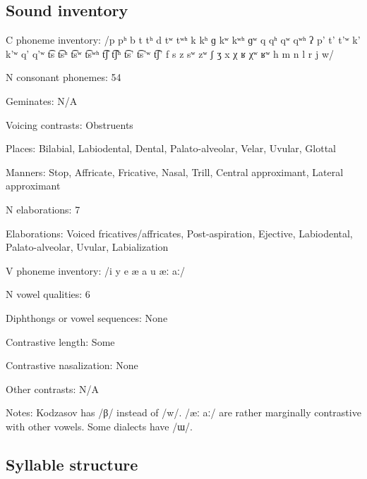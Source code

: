 {\subsection*{Sound inventory}
\begin{appendixdesc}

\item[C phoneme inventory:] /p pʰ b t tʰ d tʷ tʷʰ k kʰ ɡ kʷ kʷʰ ɡʷ q qʰ qʷ qʷʰ ʔ p’ t’ t’ʷ k’ k’ʷ q’ q’ʷ t͡s t͡sʰ t͡sʷ t͡sʷʰ t͡ʃ t͡ʃʰ t͡s’ t͡s’ʷ t͡ʃ’ f s z sʷ zʷ ʃ ʒ x χ ʁ χʷ ʁʷ h m n l r j w/

\item[N consonant phonemes:] 54

\item[Geminates:] N/A

\item[Voicing contrasts:] Obstruents

\item[Places:] Bilabial, Labiodental, Dental, Palato-alveolar, Velar, Uvular, Glottal

\item[Manners:] Stop, Affricate, Fricative, Nasal, Trill, Central approximant, Lateral approximant

\item[N elaborations:] 7

\item[Elaborations:] Voiced fricatives/affricates, Post-aspiration, Ejective, Labiodental, Palato-alveolar, Uvular, Labialization

\item[V phoneme inventory:] /i y e æ a u æː aː/

\item[N vowel qualities:] 6

\item[Diphthongs or vowel sequences:] None

\item[Contrastive length:] Some

\item[Contrastive nasalization:] None

\item[Other contrasts:] N/A

\item[Notes:] Kodzasov has /β/ instead of /w/. /æː aː/ are rather marginally contrastive with other vowels. Some dialects have /ɯ/.
\end{appendixdesc}
\subsection*{Syllable structure}
\begin{appendixdesc}


\end{appendixdesc}}
